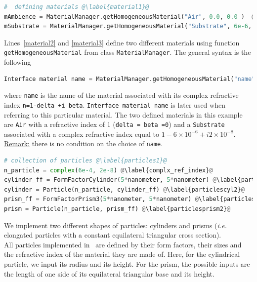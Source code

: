 

\begin{lstlisting}[language=python, style=eclipseboxed,name=ex1,nolol]
#  defining materials @\label{material1}@
mAmbience = MaterialManager.getHomogeneousMaterial("Air", 0.0, 0.0 )  @\label{material2}@
mSubstrate = MaterialManager.getHomogeneousMaterial("Substrate", 6e-6, 2e-8) @\label{material3}@
\end{lstlisting}

\noindent Lines~\ref{material2} and \ref{material3} define two different
materials using function \texttt{getHomogeneousMaterial} from class
\texttt{MaterialManager}. The general syntax is the following 

\begin{lstlisting}[language=python, style=eclipse,numbers=none]
Interface material name = MaterialManager.getHomogeneousMaterial("name", delta, beta)
\end{lstlisting}

\noindent where \texttt{name} is the name of the
material associated with its complex refractive index
\texttt{n=1-delta +i beta}. \texttt{Interface material name} is later used when
referring to this particular material. The two defined materials in this example are \texttt{Air} with a refractive
index of 1 (\texttt{delta = beta =0}) and a \texttt{Substrate} associated with a complex refractive index
equal to $1-6\times 10^{-6} +i2\times 10^{-8} $. \\

\noindent \underline{Remark:} there is no condition on the choice of
\texttt{name}. 


\begin{lstlisting}[language=python,
  style=eclipseboxed,name=ex1,nolol]
# collection of particles @\label{particles1}@
n_particle = complex(6e-4, 2e-8) @\label{complx_ref_index}@
cylinder_ff = FormFactorCylinder(5*nanometer, 5*nanometer) @\label{particlescyl1}@
cylinder = Particle(n_particle, cylinder_ff) @\label{particlescyl2}@
prism_ff = FormFactorPrism3(5*nanometer, 5*nanometer) @\label{particlesprism1}@
prism = Particle(n_particle, prism_ff) @\label{particlesprism2}@
\end{lstlisting}

 \noindent We implement two different shapes of particles: cylinders and
 prisms (\textit{i.e.} elongated particles with a constant equilateral triangular cross section).\\ All particles implemented in \BornAgain\ are defined by their
 form factors, their sizes and the refractive index of the material
  they are made of. Here, for the
  cylindrical particle, we input its radius and its height.  For the prism, 
  the possible inputs are the length of one side of its equilateral triangular
  base and its height.\\

